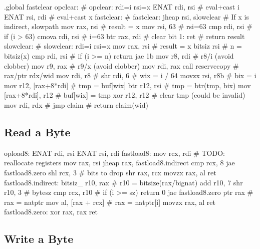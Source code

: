 \begin{asm}
.global fastclear
opclear:                                    # opclear: rdi=i rsi=x
	ENAT	rdi, rsi                    #   eval+cast i
	ENAT	rsi, rdi                    #   eval+cast x
fastclear:                                  # fastclear:
	jheap	rsi, slowclear              #   If x is indirect, slowpath
	mov	rax, rsi                    #   result = x
	mov	rsi, 63                     #   rsi=63
	cmp	rdi, rsi                    #   if (i > 63)
	cmova	rdi, rsi                    #     i=63
	btr	rax, rdi                    #   clear bit
1:	ret                                 #   return result
slowclear:                                  # slowclear: rdi=i rsi=x
	mov	rax, rsi                    #   result = x
	bitsiz	rsi                         #   n = bitsiz(x)
	cmp	rdi, rsi                    #   if (i >= n) return
	jae	1b
	mov	r8, rdi                     #   r8/i (avoid clobber)
	mov	r9, rax                     #   r9/x (avoid clobber)
	mov	rdi, rax
	call	reservecopy                 #   rax/ptr rdx/wid
	mov	rdi, r8                     #
	shr	rdi, 6                      #   wix = i / 64
	movzx	rsi, r8b                    #   bix = i %
	mov	r12, [rax+8*rdi]            #   tmp = buf[wix]
	btr	r12, rsi                    #   tmp = btr(tmp, bix)
	mov	[rax+8*rdi], r12            #   buf[wix] = tmp
	xor	r12, r12                    #   clear tmp (could be invalid)
	mov	rdi, rdx                    #
	jmp	claim                       #   return claim(wid)
\end{asm}


\subsection{Read a Byte}

\begin{asm}
opload8:
	ENAT	rdi, rsi
	ENAT	rsi, rdi
fastload8:
	mov	rcx, rdi # TODO: reallocate registers
	mov	rax, rsi
	jheap	rax, fastload8.indirect
	cmp	rcx, 8
	jae	fastload8.zero
	shl	rcx, 3             # bits to drop
	shr	rax, rcx
	movzx	rax, al
	ret
fastload8.indirect:
	bitsiz_	r10, rax           # r10 = bitsize(rax/bignat)
	add	r10, 7
	shr	r10, 3             # bytesz
	cmp	rcx, r10           # if (i >= sz) return 0
	jae	fastload8.zero
	ptr	rax                # rax = natptr
	mov	al, [rax + rcx]    # rax = natptr[i]
	movzx	rax, al
	ret
fastload8.zero:
	xor	rax, rax
	ret
\end{asm}


\subsection{Write a Byte}

